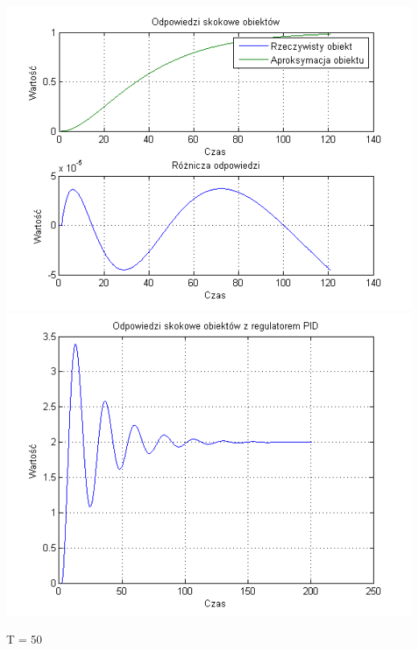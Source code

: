 \documentclass[10pt,a4paper]{article}
\begin{document}
\begin{center}
\includegraphics[scale=1]{images/dwa/skrypt_75.png}\\
\includegraphics[scale=1]{images/dwa/skrypt_76.png}\\
\end{center}
\newpage
T = 50
\end{document}
